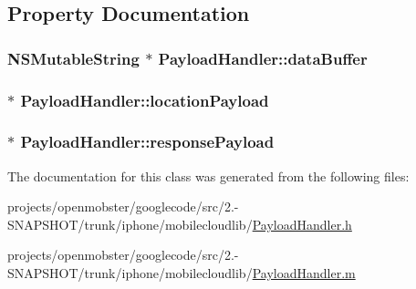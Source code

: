 \subsection{\-Property \-Documentation}
\hypertarget{interface_payload_handler_a3d4fd27fea084503a212b0a0da04b6d2}{
\subsubsection[{data\-Buffer}]{\setlength{\rightskip}{0pt plus 5cm}\-N\-S\-Mutable\-String $\ast$ \-Payload\-Handler\-::data\-Buffer}}
\label{interface_payload_handler_a3d4fd27fea084503a212b0a0da04b6d2}
\hypertarget{interface_payload_handler_a95790d2ec2ddc1b57ad86baf343ab0da}{
\subsubsection[{location\-Payload}]{ $\ast$ \-Payload\-Handler\-::location\-Payload}}
\label{interface_payload_handler_a95790d2ec2ddc1b57ad86baf343ab0da}
\hypertarget{interface_payload_handler_a9fceda7756e28f9bf6be362a12446960}{
\subsubsection[{response\-Payload}]{ $\ast$ \-Payload\-Handler\-::response\-Payload}}
\label{interface_payload_handler_a9fceda7756e28f9bf6be362a12446960}


\-The documentation for this class was generated from the following files\-:\begin{DoxyCompactItemize}
\item 
projects/openmobster/googlecode/src/2.-\/\-S\-N\-A\-P\-S\-H\-O\-T/trunk/iphone/mobilecloudlib/\hyperlink{_payload_handler_8h}{\-Payload\-Handler.\-h}\item 
projects/openmobster/googlecode/src/2.-\/\-S\-N\-A\-P\-S\-H\-O\-T/trunk/iphone/mobilecloudlib/\hyperlink{_payload_handler_8m}{\-Payload\-Handler.\-m}\end{DoxyCompactItemize}
